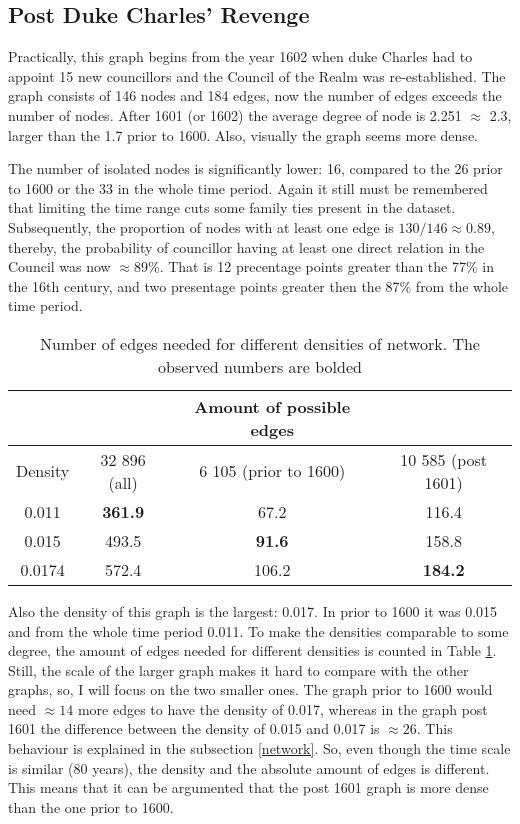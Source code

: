 \subsection{Post Duke Charles' Revenge}
Practically, this graph begins from the year 1602 when duke Charles had to appoint 15 new councillors and the Council of the Realm was re-established. The graph consists of 146 nodes and 184 edges, now the number of edges exceeds the number of nodes. After 1601 (or 1602) the average degree of node is 2.251 $\approx$ 2.3, larger than the 1.7 prior to 1600. Also, visually the graph seems more dense. 

The number of isolated nodes is significantly lower: 16, compared to the 26 prior to 1600 or the 33 in the whole time period. Again it still must be remembered that limiting the time range cuts some family ties present in the dataset. Subsequently, the proportion of nodes with at least one edge is $130/146 \approx 0.89$, thereby, the probability of councillor having at least one direct relation in the Council was now $\approx 89\%$. That is 12 precentage points greater than the 77\% in the 16th century, and two presentage points greater then the 87\% from the whole time period.

\begin{table}
	\caption[Number of edges needed for different densities of network]{Number of edges needed for different densities of network. The observed numbers are bolded}
	\label{edges}
	\begin{tabular}{cccc}
		\hline
		&& Amount of possible edges & \\
		\hline
		Density & 32 896 (all) & 6 105 (prior to 1600) & 10 585 (post 1601) \\
		\hline 
		0.011 & \textbf{361.9} & 67.2 & 116.4 \\
		\hline
		0.015 & 493.5 & \textbf{91.6} & 158.8 \\
		\hline
		0.0174 & 572.4 & 106.2 & \textbf{184.2}\\
		\hline
	\end{tabular}
\end{table}

Also the density of this graph is the largest: 0.017. In prior to 1600 it was 0.015 and from the whole time period 0.011. To make the densities comparable to some degree, the amount of edges needed for different densities is counted in Table \ref{edges}. Still, the scale of the larger graph makes it hard to compare with the other graphs, so, I will focus on the two smaller ones. The graph prior to 1600 would need $\approx 14$ more edges to have the density of 0.017, whereas in the graph post 1601 the difference between the density of 0.015 and 0.017 is $\approx 26$. This behaviour is explained in the subsection \ref{network}. So, even though the time scale is similar (80 years), the density and the absolute amount of edges is different. This means that it can be argumented that the post 1601 graph is more dense than the one prior to 1600. 

